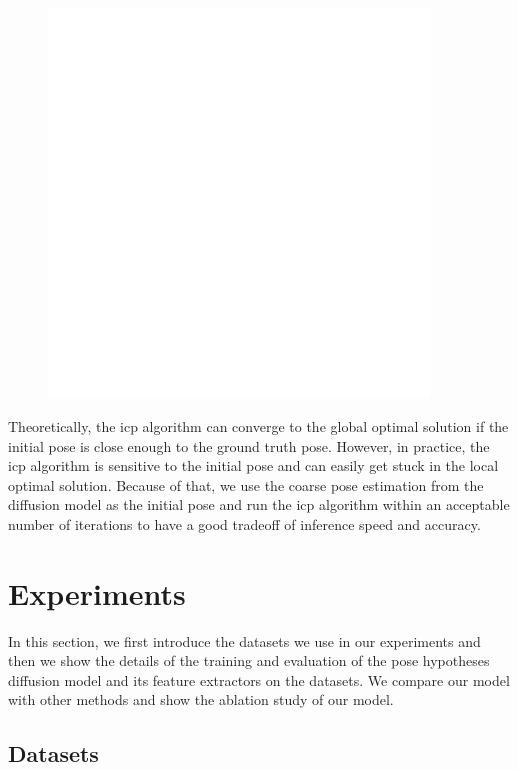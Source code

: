 \documentclass[12pt,DIV14,BCOR12mm,a4paper,footinclude=false,headinclude,parskip=half-,twoside,openright,cleardoublepage=empty,toc=index,bibliography=totoc,listof=totoc]{scrreprt}
\numberwithin{equation}{chapter}
\begin{document}
\begin{figure}[h]
  \centering
  \includegraphics[width=0.9\textwidth]{img/spacer.pdf}
  \label{img:spacer}
\end{figure}

Theoretically, the \gls{icp} algorithm can converge to the global optimal solution if the initial pose is close enough to the ground truth pose. However, in practice, the \gls{icp} algorithm is sensitive to the initial pose and can easily get stuck in the local optimal solution. Because of that, we use the coarse pose estimation from the diffusion model as the initial pose and run the \gls{icp} algorithm within an acceptable number of iterations to have a good tradeoff of inference speed and accuracy. 

\chapter{Experiments}
In this section, we first introduce the datasets we use in our experiments and then we show the details of the training and evaluation of the pose hypotheses diffusion model and its feature extractors on the datasets. We compare our model with other methods and show the ablation study of our model.
\section{Datasets}
\end{document}
